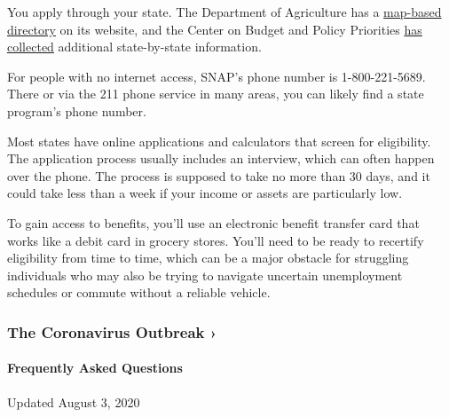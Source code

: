 You apply through your state. The Department of Agriculture has a
\href{https://www.fns.usda.gov/snap/state-directory}{map-based
directory} on its website, and the Center on Budget and Policy
Priorities
\href{https://www.cbpp.org/research/food-assistance/snap-state-by-state-data-fact-sheets-and-resources}{has
collected} additional state-by-state information.

For people with no internet access, SNAP's phone number is
1-800-221-5689. There or via the 211 phone service in many areas, you
can likely find a state program's phone number.

Most states have online applications and calculators that screen for
eligibility. The application process usually includes an interview,
which can often happen over the phone. The process is supposed to take
no more than 30 days, and it could take less than a week if your income
or assets are particularly low.

To gain access to benefits, you'll use an electronic benefit transfer
card that works like a debit card in grocery stores. You'll need to be
ready to recertify eligibility from time to time, which can be a major
obstacle for struggling individuals who may also be trying to navigate
uncertain unemployment schedules or commute without a reliable vehicle.

\href{https://www.nytimes3xbfgragh.onion/news-event/coronavirus?action=click\&pgtype=Article\&state=default\&region=MAIN_CONTENT_3\&context=storylines_faq}{}

\hypertarget{the-coronavirus-outbreak-}{%
\subsubsection{The Coronavirus Outbreak
›}\label{the-coronavirus-outbreak-}}

\hypertarget{frequently-asked-questions}{%
\paragraph{Frequently Asked
Questions}\label{frequently-asked-questions}}

Updated August 3, 2020

